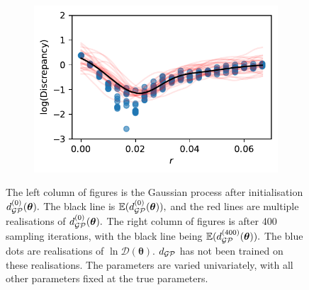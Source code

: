 \begin{figure}[htbp]
\begin{subfigure}[b]{0.5\textwidth}
        \includegraphics[width=\textwidth]{
            ../champagne_GP_images/r_slice_400_bolfi_updates_log_discrep.pdf
        }
    \end{subfigure}
    \caption[{
        Initial and final regressed Gaussian processes for each parameter 
        except for treatment parameters
    }]{
        The left column of figures is the Gaussian process after initialisation
        $d_{\mathcal{GP}}^{(0)}(\bm{\theta}).$ The black line is $\operatorname{\mathbb{E}}(d_{\mathcal{GP}}^{(0)}(\bm{\theta})),$
        and the red lines are multiple realisations of
        $d_{\mathcal{GP}}^{(0)}(\bm{\theta}).$ The right column of figures is after 400
        sampling iterations, with the black line being
        $\operatorname{\mathbb{E}}(d_{\mathcal{GP}}^{(400)}(\bm{\theta})).$
        The blue dots are realisations of $\ln\mathcal{D}(\bm{\theta}).$
        $d_{\mathcal{GP}}$ has not been trained on these realisations.
        The parameters are varied
        univariately, with all other parameters fixed at the true parameters.
    }
    \label{fig:improving_GP}
\end{figure}

